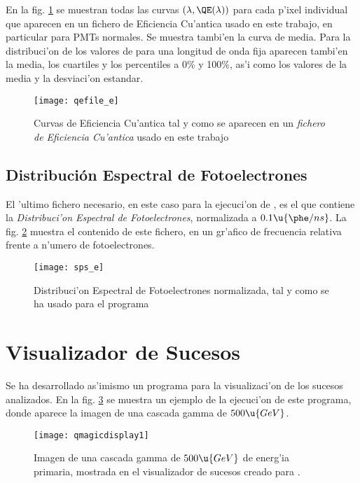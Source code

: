 En la fig. \ref{fig:qefile} se muestran todas las curvas $(\lambda,
\QE(\lambda))$ para cada p'ixel individual que aparecen en un fichero
de Eficiencia Cu'antica usado en este trabajo, en particular para PMTs
normales.  Se muestra tambi'en la curva de \QE media. Para la
distribuci'on de los valores de \QE para una longitud de onda fija
aparecen tambi'en la media, los cuartiles y los percentiles a 0\% y
100\%, as'i como los valores de la media y la desviaci'on estandar.

\begin{figure}[htbp]
  \centering
  \texttt{[image: qefile\_e]}
  \caption{Curvas de Eficiencia Cu'antica tal y como se aparecen en un
    \emph{fichero de Eficiencia Cu'antica} usado en este trabajo}
  \label{fig:qefile}
\end{figure}


\subsection{Distribuci\'on Espectral de Fotoelectrones}
\label{sec:sps}

El 'ultimo fichero necesario, en este caso para la ejecuci'on de
\camera, es el que contiene la \emph{Distribuci'on Espectral de
  Fotoelectrones}, normalizada a $0.1\u{\phe/ns}$. La fig.
\ref{fig:sps} muestra el contenido de este fichero, en un gr'afico de
frecuencia relativa frente a n'umero de fotoelectrones.

\begin{figure}[htbp]
  \centering
  \texttt{[image: sps\_e]}
  \caption{Distribuci'on Espectral de
    Fotoelectrones normalizada, tal y como se ha usado para el
    programa \camera}
  \label{fig:sps}
\end{figure}



\section{Visualizador de Sucesos}
\label{sec:eventdisplay}

Se ha desarrollado as'imismo un programa para la visualizaci'on de los
sucesos analizados.  En la fig. \ref{fig:qmagicdisplay} se muestra un
ejemplo de la ejecuci'on de este programa, donde aparece la imagen de
una cascada gamma de $500\u{GeV}$.

\begin{figure}[htbp]
  \centering
  \texttt{[image: qmagicdisplay1]}
  \caption{Imagen de una cascada gamma de $500\u{GeV}$ de energ'ia
    primaria, mostrada en el visualizador de sucesos creado para
    \MAGIC.}
  \label{fig:qmagicdisplay}
\end{figure}


\endinput
%

